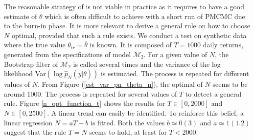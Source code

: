 \documentclass[11pt,a4,twosided,singlespacing,titlepagenumber=on]{scrreprt}
\numberwithin{equation}{chapter} %
\theoremstyle{remark}
\begin{document}
The reasonable strategy of \cite{pitt2012} is not viable in practice as it requires to have a good estimate of $\bar{\theta}$ which is often difficult to achieve with a short run of PMCMC due to the burn-in phase. It is more relevant to derive a general rule on how to choose $N$ optimal, provided that such a rule exists. We conduct a test on synthetic data where the true value $\theta_{tr} = \bar{\theta}$ is known. It is composed of $T=1000$ daily returns, generated from the specifications of model $\mathcal{M}_2$. For a given value of $N$, the Bootstrap filter of $\mathcal{M}_2$ is called several times and the variance of the log likelihood Var$(\log \hat{p}_N(y|\bar{\theta}))$ is estimated. The process is repeated for different values of $N$. From Figure (\ref{est_var_pn_theta_n}), the optimal of $N$ seems to be around 1000. The process is repeated for several values of $T$ to detect a general rule. Figure \ref{n_opt_function_t} shows the results for $T \in [0, 2000]$ and $N \in [0, 2500]$. A linear trend can easily be identified. To reinforce this belief, a linear regression $N = a T + b$ is fitted. Both the values $b \simeq 0 (3)$ and $a \simeq 1 (1.2)$ suggest that the rule $T = N$ seems to hold, at least for $T < 2000$.
\end{document}
